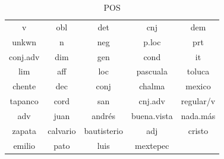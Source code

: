 \documentclass[letterpaper,12pt,oneside]{book}
\begin{document}
	
	\begin{table}

		\centering

		\begin{tabular}{| c | c | c | c | c |}

			\hline

			v & obl & det & cnj & dem \\ 

			unkwn & n & neg & p.loc & prt \\

			conj.adv & dim & gen & cond & it \\

			lim & aff & loc & pascuala & toluca \\

			chente & dec & conj & chalma & mexico \\

			tapanco & cord & san & cnj.adv & regular/v \\

			adv & juan & andrés & buena.vista & nada.más \\

			zapata & calvario & bautisterio & adj & cristo \\

			emilio & pato & luis & mextepec & \\

			\hline

		\end{tabular}

		\caption{POS} 

		\label{table_pos_types}

	\end{table}

	
	
\end{document}

